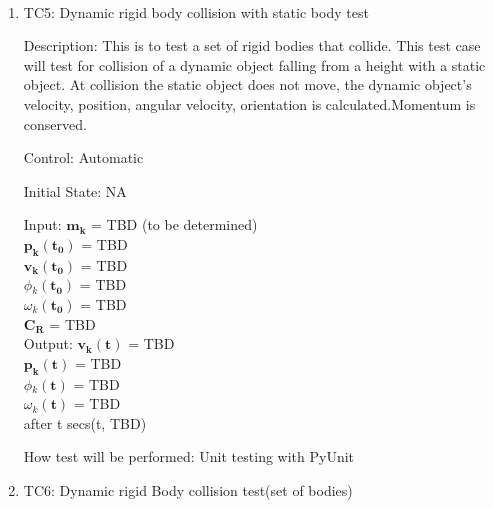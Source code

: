 \documentclass[12pt, titlepage]{article}
\begin{document}
\paragraph{}
\begin{enumerate}
	
	\item{TC5: Dynamic rigid body collision with static body test\\}
	
	Description: This is to test a set of rigid bodies that collide. This test case will test for collision of a dynamic object falling from a height with a static object. At collision the static object does not move, the dynamic object's velocity, position, angular velocity, orientation is calculated.Momentum is conserved.
	
	Control: Automatic
	
	Initial State: NA
	
	Input: $\mathbf{m_k}$$\mathbf{}$ = TBD (to be determined)\\
	\hspace*{1.3cm}$\mathbf{p_k}$$\mathbf{(t_0)}$ = TBD\\
	\hspace*{1.3cm}$\mathbf{v_k}$$\mathbf{(t_0)}$ = TBD\\
	\hspace*{1.3cm}$\phi$$_k\mathbf{(t_0)}$ = TBD\\
	\hspace*{1.3cm}$\omega$$_k\mathbf{(t_0)}$$ \mathbf{}$ = TBD\\
	\hspace*{1.3cm}$\mathbf{C_R}$$\mathbf{}$ = TBD \\
	
	
	Output:  $\mathbf{v_k}$$\mathbf{(t)}$ = TBD \\
	\hspace*{1.3cm}$\mathbf{p_k}$$\mathbf{(t)}$ = TBD\\
	\hspace*{1.3cm}$\phi$$_k\mathbf{(t)}$ = TBD\\
	\hspace*{1.3cm}$\omega$$_k\mathbf{(t)}$$ \mathbf{}$ = TBD\\
	 after t secs(t, TBD) 
	 
	
	How test will be performed: Unit testing with PyUnit
	
	\item{TC6: Dynamic rigid Body collision test(set of bodies)\\}


\end{enumerate}
\end{document}
